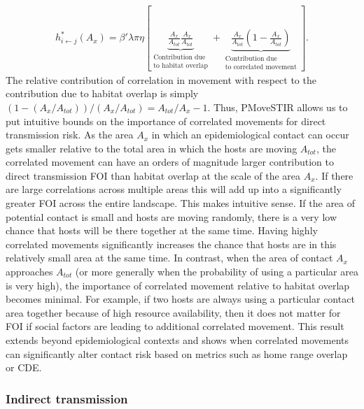 \documentclass[letterpaper]{article}
\begin{document}
\begin{equation}
    \begin{aligned}
        h^*_{i \leftarrow j}(A_x) = \beta' \lambda \pi \eta \left[\underbrace{\frac{A_x}{A_{tot}}\frac{A_x}{A_{tot}}}_{\substack{\text{Contribution due} \\  \text{to habitat overlap}}} + \underbrace{\frac{A_x}{A_{tot}}(1 - \frac{A_x}{A_{tot}})}_{\substack{\text{Contribution due} \\ \text{to correlated movement}}} \right].
    \end{aligned}
    \label{eq:uniform_direct}
\end{equation}
The relative contribution of correlation in movement with respect to the contribution due to habitat overlap is simply $(1 - (A_x / A_{tot})) / (A_x / A_{tot})=A_{tot}/A_x-1$. 
Thus, PMoveSTIR allows us to put intuitive bounds on the importance of correlated movements for direct transmission risk. 
As the area $A_x$ in which an epidemiological contact can occur gets smaller relative to the total area in which the hosts are moving $A_{tot}$, the correlated movement can have an orders of magnitude larger contribution to direct transmission FOI than habitat overlap at the scale of the area $A_x$. If there are large  correlations across multiple areas this will add up into a significantly greater FOI across the entire landscape.
This makes intuitive sense. If the area of potential contact is small and hosts are moving randomly, there is a very low chance that hosts will be there together at the same time.  Having highly correlated movements significantly increases the chance that hosts are in this relatively small area at the same time.  
In contrast, when the area of contact $A_x$ approaches $A_{tot}$ (or more generally when the probability of using a particular area is very high), the importance of correlated movement relative to habitat overlap becomes minimal. For example, if two hosts are always using a particular contact area together because of high resource availability, then it does not matter for FOI if social factors are leading to additional correlated movement. This result extends beyond epidemiological contexts and shows when correlated movements can significantly alter contact risk based on metrics such as home range overlap or CDE.

\subsubsection*{Indirect transmission}
\end{document}
